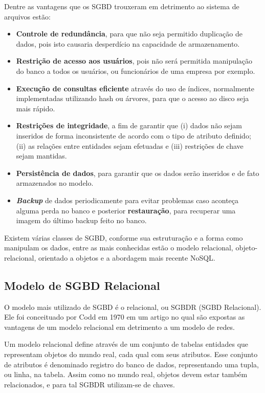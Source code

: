 Dentre as vantagens que os SGBD trouxeram em detrimento ao sistema de arquivos estão:

\begin{itemize}
    \item{\textbf{Controle de redundância}}, para que não seja permitido duplicação de dados, pois isto causaria desperdício na capacidade de armazenamento.
    \item{\textbf{Restrição de acesso aos usuários}}, pois não será permitida manipulação do banco a todos os usuários, ou funcionários de uma empresa por exemplo.
    \item{\textbf{Execução de consultas eficiente}} através do uso de índices, normalmente implementadas utilizando hash ou árvores, para que o acesso ao disco seja mais rápido.
    \item{\textbf{Restrições de integridade}}, a fim de garantir que (i) dados não sejam inseridos de forma inconsistente de acordo com o tipo de atributo definido; 
    (ii) as relações entre entidades sejam efetuadas e (iii) restrições de chave sejam mantidas.
    \item{\textbf{Persistência de dados}}, para garantir que os dados serão inseridos e de fato armazenados no modelo.
    \item{\textbf{\textit{Backup}}} de dados periodicamente para evitar problemas caso aconteça alguma perda no banco e posterior \textbf{restauração}, para recuperar uma imagem do último backup feito no banco.
\end{itemize}

Existem várias classes de SGBD, conforme sua estruturação e a forma como manipulam os dados, 
entre as mais conhecidas estão o modelo relacional, objeto-relacional, orientado a 
objetos e a abordagem mais recente NoSQL.

\subsection{Modelo de SGBD Relacional}
\label{section:sgbd_relacional}

O modelo mais utilizado de SGBD é o relacional, ou SGBDR (SGBD Relacional). Ele foi conceituado por 
Codd \cite{codd1970relational} em 1970 em um artigo no qual são expostas as 
vantagens de um modelo relacional em detrimento a um modelo de redes. 

Um modelo relacional define através de um conjunto de tabelas entidades que representam 
objetos do mundo real, cada qual com seus atributos. Esse conjunto de atributos é 
denominado registro do banco de dados, representando uma tupla, ou linha, na tabela. Assim como no mundo real, 
objetos devem estar também relacionados, e para tal SGBDR utilizam-se de chaves.

